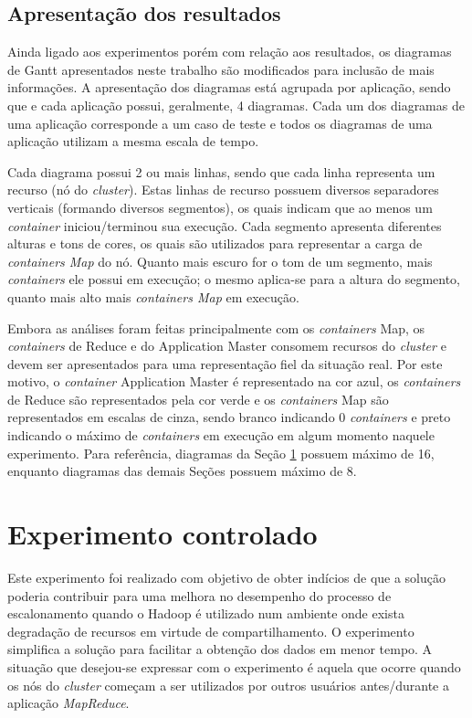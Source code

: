 \subsection{Apresentação dos resultados}
\label{sec:apresentacao}
Ainda ligado aos experimentos porém com relação aos resultados, os diagramas de Gantt apresentados neste trabalho são modificados para inclusão de mais informações. A apresentação dos diagramas está agrupada por aplicação, sendo que e cada aplicação possui, geralmente, 4 diagramas. Cada um dos diagramas de uma aplicação corresponde a um caso de teste e todos os diagramas de uma aplicação utilizam a mesma escala de tempo.

Cada diagrama possui 2 ou mais linhas, sendo que cada linha representa  um recurso (nó do \textit{cluster}). Estas linhas de recurso possuem diversos separadores verticais (formando diversos segmentos), os quais indicam que ao menos um \textit{container} iniciou/terminou sua execução. Cada segmento apresenta diferentes alturas e tons de cores, os quais são utilizados para representar a carga de \textit{containers Map} do nó. Quanto mais escuro for o tom de um segmento, mais \textit{containers} ele possui em execução; o mesmo aplica-se para a altura do segmento, quanto mais alto mais \textit{containers Map} em execução.

Embora as análises foram feitas principalmente com os \textit{containers} Map, os \textit{containers} de Reduce e do Application Master consomem recursos do \textit{cluster} e devem ser apresentados para uma representação fiel da situação real. Por este motivo, o \textit{container} Application Master é representado na cor azul, os \textit{containers} de Reduce são representados pela cor verde e os \textit{containers} Map são representados em escalas de cinza, sendo branco indicando 0 \textit{containers} e preto indicando o máximo de \textit{containers} em execução em algum momento naquele experimento. Para referência, diagramas da Seção \ref{sec:expCont} possuem máximo de 16, enquanto diagramas das demais Seções possuem máximo de 8.

\section{Experimento controlado}
\label{sec:expCont}
Este experimento foi realizado com objetivo de obter indícios de que a solução poderia contribuir para uma melhora no desempenho do processo de escalonamento quando o Hadoop é utilizado num ambiente onde exista degradação de recursos em virtude de compartilhamento. O experimento simplifica a solução para facilitar a obtenção dos dados em menor tempo. A situação que desejou-se expressar com o experimento é aquela que ocorre quando os nós do \textit{cluster} começam a ser utilizados por outros usuários antes/durante a aplicação \textit{MapReduce}.

